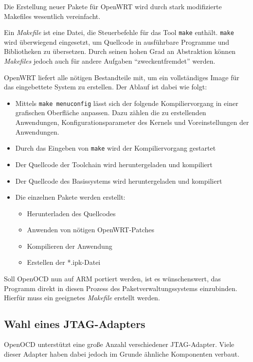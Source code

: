 Die Erstellung neuer Pakete für OpenWRT wird durch stark modifizierte Makefiles
wesentlich vereinfacht.
 \begin{definition}[Makefile]
Ein \emph{Makefile} ist eine Datei, die Steuerbefehle für das Tool
\texttt{make} enthält. \texttt{make} wird überwiegend eingesetzt, um Quellcode
in ausführbare Programme und Bibliotheken zu übersetzen. Durch seinen hohen
Grad an Abstraktion können \emph{Makefiles} jedoch auch für andere Aufgaben
"`zweckentfremdet"' werden.
\end{definition}
OpenWRT liefert alle nötigen Bestandteile mit, um ein vollständiges Image für
das eingebettete System zu erstellen.
Der Ablauf ist dabei wie folgt:
\begin{itemize}
  \item Mittels \texttt{make menuconfig} lässt sich der folgende
  Kompiliervorgang in einer grafischen Oberfläche anpassen. Dazu zählen die zu
  erstellenden Anwendungen, Konfigurationsparameter des Kernels und
  Voreinstellungen der Anwendungen.
  \item Durch das Eingeben von \texttt{make} wird der Kompiliervorgang
  gestartet
  \item Der Quellcode der Toolchain wird heruntergeladen und kompiliert
  \item Der Quellcode des Basissystems wird heruntergeladen und kompiliert
  \item Die einzelnen Pakete werden erstellt:
  \begin{itemize}
    \item Herunterladen des Quellcodes
    \item Anwenden von nötigen OpenWRT-Patches
    \item Kompilieren der Anwendung
    \item Erstellen der *.ipk-Datei
  \end{itemize}
\end{itemize}

Soll OpenOCD nun auf ARM portiert werden, ist es wünschenswert, das Programm
direkt in diesen Prozess des Paketverwaltungssystems einzubinden. Hierfür muss
ein geeignetes \emph{Makefile} erstellt werden.

\subsection{Wahl eines JTAG-Adapters}
OpenOCD unterstützt eine große Anzahl verschiedener JTAG-Adapter. Viele dieser
Adapter haben dabei jedoch im Grunde ähnliche Komponenten verbaut.

